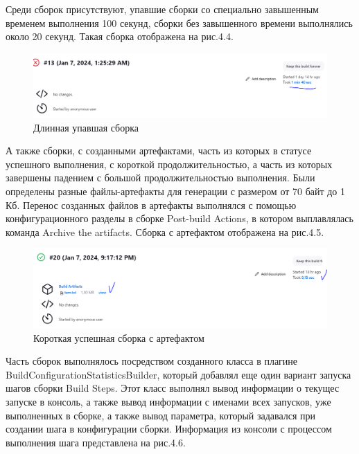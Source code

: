  Среди сборок присутствуют, упавшие сборки со специально завышенным временем выполнения 100 секунд, сборки без завышенного времени выполнялись около 20 секунд. Такая сборка отображена на рис.4.4.
 
 \begin{figure}[ht!] 
	\center
	\includegraphics [scale=0.47] {my_folder/images//longBuild}
	\caption{Длинная упавшая сборка} 
	\label{fig:longBuild}  
\end{figure}


А также сборки, с созданными артефактами, часть из которых в статусе успешного выполнения, с короткой продолжительностью, а часть из которых завершены падением с большой продолжительностью выполнения. Были определены разные файлы-артефакты для генерации с размером от 70 байт до 1 Кб. Перенос созданных файлов в артефакты выполнялся с помощью конфигурационного разделы в сборке Post-build Actions, в котором выплавлялась команда Archive the artifacts. Сборка с артефактом отображена на рис.4.5.
 
 \begin{figure}[ht!] 
	\center
	\includegraphics [scale=0.47] {my_folder/images//artifactBuild}
	\caption{Короткая успешная сборка с артефактом} 
	\label{fig:artifactBuild}  
\end{figure}



Часть сборок выполнялось посредством созданного класса в плагине BuildConfigurationStatisticsBuilder, который добавлял еще один вариант запуска шагов сборки Build Steps. Этот класс выполнял вывод информации о текущес запуске в консоль, а также вывод информации с именами всех запусков, уже выполненных в сборке, а также вывод параметра, который задавался при создании шага в конфигурации сборки. Информация из консоли с процессом выполнения шага представлена на рис.4.6.

